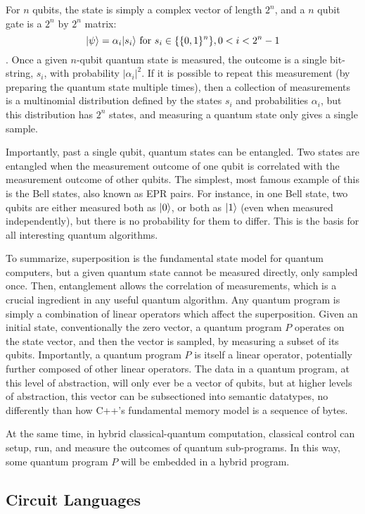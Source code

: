 \documentclass[journal]{article}
\DeclarePairedDelimiter\ket{\lvert}{\rangle}
\begin{document}
For $n$ qubits, the state is simply a complex vector of length $2^n$, and a $n$ qubit gate is a $2^n \text{ by } 2^n$ matrix:
$$\ket{\psi} = \alpha_i\ket{s_i} \text{ for } s_i \in \{\{0, 1\}^n\}, 0 < i < 2^n - 1$$.
Once a given $n$-qubit quantum state is measured, the outcome is a single bit-string, $s_i$, with probability $|\alpha_i|^2$.
If it is possible to repeat this measurement (by preparing the quantum state multiple times), then a collection of measurements is a multinomial distribution defined by the states $s_i$ and probabilities $\alpha_i$, but this distribution has $2^n$ states, and measuring a quantum state only gives a single sample.

Importantly, past a single qubit, quantum states can be entangled.
Two states are entangled when the measurement outcome of one qubit is correlated with the measurement outcome of other qubits.
The simplest, most famous example of this is the Bell states, also known as EPR pairs.
For instance, in one Bell state, two qubits are either measured both as $\ket{0}$, or both as $\ket{1}$ (even when measured independently), but there is no probability for them to differ.
This is the basis for all interesting quantum algorithms.

To summarize, superposition is the fundamental state model for quantum computers, but a given quantum state cannot be measured directly, only sampled once.
Then, entanglement allows the correlation of measurements, which is a crucial ingredient in any useful quantum algorithm. 
Any quantum program is simply a combination of linear operators which affect the superposition.
Given an initial state, conventionally the zero vector, a quantum program $P$ operates on the state vector, and then the vector is sampled, by measuring a subset of its qubits.
Importantly, a quantum program $P$ is itself a linear operator, potentially further composed of other linear operators.
The data in a quantum program, at this level of abstraction, will only ever be a vector of qubits, but at higher levels of abstraction, this vector can be subsectioned into semantic datatypes, no differently than how C++'s fundamental memory model is a sequence of bytes.

At the same time, in hybrid classical-quantum computation, classical control can setup, run, and measure the outcomes of quantum sub-programs.
In this way, some quantum program $P$ will be embedded in a hybrid program.

\subsection{Circuit Languages}
\end{document}
